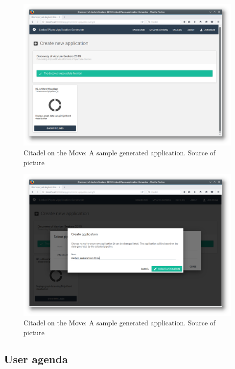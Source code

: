 \begin{figure}
	\centering
	\includegraphics[width=145mm]{img/05_scenario_02_discovery_result.png}
	\caption{Citadel on the Move: A sample generated application. Source of picture \cite{citadel_agt_doc}}
	\label{fig:scenario-02-discovery-result}
\end{figure}

\begin{figure}
	\centering
	\includegraphics[width=145mm]{img/05_scenario_03_create_application.png}
	\caption{Citadel on the Move: A sample generated application. Source of picture \cite{citadel_agt_doc}}
	\label{fig:scenario-03-create-application}
\end{figure}


\subsection{User agenda}

